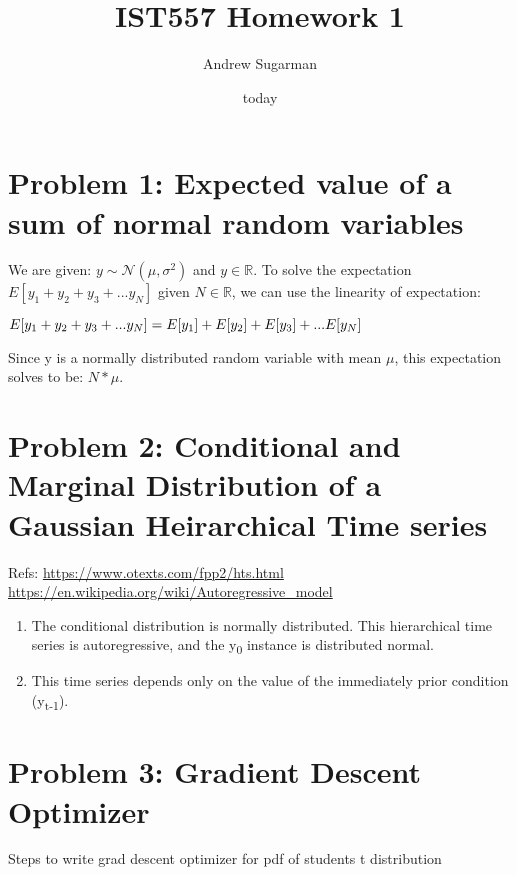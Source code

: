 \documentclass[11pt]{article}
\author{Andrew Sugarman}
\date{today}
\title{IST557 Homework 1}
\begin{document}
\maketitle
\tableofcontents

\section{Problem 1: Expected value of a sum of normal random variables}
\label{sec:org66c16cf}

We are given: \(y \sim \mathcal{N}(\mu, \sigma^2)\) and \(y \in \mathbb{R}\). To solve the expectation \(E[y_{1}+y_{2}+y_{3}+ ... y_{N}]\) given \(N \in \mathbb{R}\), we can use the linearity of expectation:

\(\\ E[y_{1}+y_{2}+y_{3}+ ... y_{N}] = E[y_{1}] + E[y_{2}] + E[y_{3}] + ... E[y_{N}] \\\)

Since y is a normally distributed random variable with mean \(\mu\), this expectation solves to be: \(N*\mu\).
\section{Problem 2: Conditional and Marginal Distribution of a Gaussian Heirarchical Time series}
\label{sec:org511d7cb}

Refs:
\url{https://www.otexts.com/fpp2/hts.html}
\url{https://en.wikipedia.org/wiki/Autoregressive\_model}

\begin{enumerate}
\item The conditional distribution is normally distributed. This hierarchical time series is autoregressive, and the y\textsubscript{0} instance is distributed normal.
\item This time series depends only on the value of the immediately prior condition (y\textsubscript{t-1}).
\end{enumerate}
\section{Problem 3: Gradient Descent Optimizer}
\label{sec:orgf085e4e}
Steps to write grad descent optimizer for pdf of students t distribution
\end{document}
